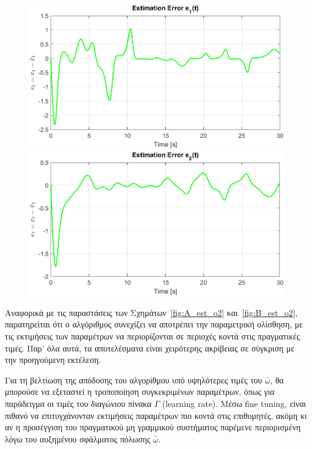 \documentclass[12pt]{article} %
\numberwithin{equation}{section}  %
\begin{document}
\begin{figure}[ht!]
    \centering
    \begin{minipage}{0.48\textwidth}
        \centering
        \includegraphics[width=0.8\linewidth]{plots/plot7_3_e1_o2.png}
    \end{minipage}
    \hfill
    \begin{minipage}{0.48\textwidth}
        \centering
        \includegraphics[width=0.8\linewidth]{plots/plot7_4_e2_o2.png}
    \end{minipage}
    
    \caption{}
    \label{fig:x_err_o2}
\end{figure}

Αναφορικά με τις παραστάσεις των Σχημάτων~\ref{fig:A_est_o2} και~\ref{fig:B_est_o2}, 
παρατηρείται ότι ο αλγόριθμος συνεχίζει να αποτρέπει την παραμετρική ολίσθηση, 
με τις εκτιμήσεις των παραμέτρων να περιορίζονται σε περιοχές κοντά στις πραγματικές τιμές. 
Παρ' όλα αυτά, τα αποτελέσματα είναι χειρότερης ακρίβειας σε σύγκριση με την προηγούμενη εκτέλεση.

Για τη βελτίωση της απόδοσης του αλγορίθμου υπό υψηλότερες τιμές του $\bar\omega$, 
θα μπορούσε να εξεταστεί η τροποποίηση συγκεκριμένων παραμέτρων, 
όπως για παράδειγμα οι τιμές του διαγώνιου πίνακα $\Gamma$ (learning rate). 
Μέσω fine tuning, είναι πιθανό να επιτυγχάνονταν εκτιμήσεις παραμέτρων πιο κοντά στις επιθυμητές, 
ακόμη κι αν η προσέγγιση του πραγματικού μη γραμμικού συστήματος παρέμενε περιορισμένη λόγω του αυξημένου σφάλματος πόλωσης $\bar\omega$.
\end{document}
